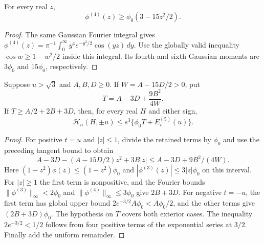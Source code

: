 \begin{lemma}
For every real $z$,
\[
 \phi^{(4)}(z)\ge\phi_0(3-15z^2/2).
\]
\end{lemma}
\begin{proof}
The same Gaussian Fourier integral gives
$\phi^{(4)}(z)=\pi^{-1}\int_0^\infty
y^4e^{-y^2/2}\cos(yz)\,dy$.
Use the globally valid inequality $\cos w\ge1-w^2/2$ inside
this integral. Its fourth and sixth Gaussian moments are $3\phi_0$
and $15\phi_0$, respectively.
\end{proof}

\begin{lemma}\label{j:local:support:envelope}
Suppose $u>\sqrt3$ and $A,B,D\ge0$. If
$W=A-15D/2>0$, put
\[
 T=A-3D+\frac{9B^2}{4W}.
\]
If $T\ge A/2+2B+3D$, then, for every real $H$ and either sign,
\[
 \mathcal H_n(H,\pm u)\le s^3\{\phi_0 T+E^{(5)}_v(u)\}.
\]
\end{lemma}
\begin{proof}
For positive $t=u$ and $|z|\le1$, divide the retained terms by
$\phi_0$ and use the preceding tangent bound to obtain
\[
 A-3D-(A-15D/2)z^2+3B|z|
 \le A-3D+9B^2/(4W).
\]
Here $(1-z^2)\phi(z)\le(1-z^2)\phi_0$ and
$|\phi^{(3)}(z)|\le3|z|\phi_0$ on this interval.
For $|z|\ge1$ the first term is nonpositive, and the Fourier bounds
$\|\phi^{(3)}\|_\infty<2\phi_0$ and
$\|\phi^{(4)}\|_\infty\le3\phi_0$ give $2B+3D$.
For negative $t=-u$, the first term has global upper bound
$2e^{-3/2}A\phi_0<A\phi_0/2$, and the other terms give
$(2B+3D)\phi_0$. The hypothesis on $T$ covers both exterior cases.
The inequality $2e^{-3/2}<1/2$ follows from four positive terms of
the exponential series at $3/2$. Finally add the uniform remainder.
\end{proof}

